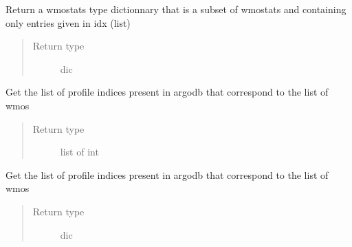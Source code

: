 \documentclass[letterpaper,10pt,english]{sphinxmanual}
\begin{document}

\begin{fulllineitems}
\label{\detokenize{pargopy:pargopy.research_tools.extract_idx_from_wmostats}}
Return a wmostats type dictionnary that is a subset of wmostats and
containing only entries given in idx (list)
\begin{quote}\begin{description}
\item[{Return type}] \leavevmode
dic

\end{description}\end{quote}

\end{fulllineitems}


\begin{fulllineitems}
\label{\detokenize{pargopy:pargopy.research_tools.get_idx_from_list_wmo}}
Get the list of profile indices present in argodb that correspond
to the list of wmos
\begin{quote}\begin{description}
\item[{Return type}] \leavevmode
list of int

\end{description}\end{quote}

\end{fulllineitems}


\begin{fulllineitems}
\label{\detokenize{pargopy:pargopy.research_tools.get_idx_from_tiles_lim}}
Get the list of profile indices present in argodb that correspond
to the list of wmos
\begin{quote}\begin{description}
\item[{Return type}] \leavevmode
dic

\end{description}\end{quote}

\end{fulllineitems}
\end{document}
